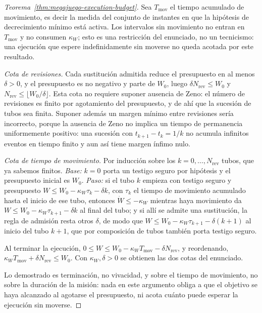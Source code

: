 \begin{proof}[Teorema~\ref{thm:megajuego-execution-budget}]
Sea $T_{\mathrm{mov}}$ el tiempo acumulado de movimiento, es decir la medida
del conjunto de instantes en que la hipótesis de decrecimiento mínimo está
activa. Los intervalos sin movimiento no entran en $T_{\mathrm{mov}}$ y no
consumen $\kappa_W$; esto es una restricción del enunciado, no un tecnicismo:
una ejecución que espere indefinidamente sin moverse no queda acotada por este
resultado.

\emph{Cota de revisiones.} Cada sustitución admitida reduce el presupuesto en
al menos $\delta>0$, y el presupuesto es no negativo y parte de $W_0$, luego
$\delta N_{\mathrm{rev}}\leq W_0$ y $N_{\mathrm{rev}}\leq\lfloor W_0/\delta\rfloor$.
Esta cota no requiere suponer ausencia de Zeno: el número de
revisiones es finito por agotamiento del presupuesto, y de ahí que la sucesión
de tubos sea finita. Suponer además un margen mínimo entre revisiones sería
incorrecto, porque la ausencia de Zeno no implica un tiempo de permanencia
uniformemente positivo: una sucesión con $t_{k+1}-t_k=1/k$ no acumula
infinitos eventos en tiempo finito y aun así tiene margen ínfimo nulo.

\emph{Cota de tiempo de movimiento.} Por inducción sobre los
$k=0,\ldots,N_{\mathrm{rev}}$ tubos, que ya sabemos finitos. \emph{Base:}
$k=0$ porta un testigo seguro por hipótesis y el presupuesto inicial es $W_0$.
\emph{Paso:} si el tubo $k$ empieza con testigo seguro y presupuesto
$W\leq W_0-\kappa_W\tau_k-\delta k$, con $\tau_k$ el tiempo de movimiento
acumulado hasta el inicio de ese tubo, entonces $\dot W\leq-\kappa_W$ mientras
haya movimiento da $W\leq W_0-\kappa_W\tau_{k+1}-\delta k$ al final del tubo; y
si allí se admite una sustitución, la regla de admisión resta otros $\delta$,
de modo que $W\leq W_0-\kappa_W\tau_{k+1}-\delta(k+1)$ al inicio del tubo
$k+1$, que por composición de tubos también porta testigo seguro.

Al terminar la ejecución, $0\leq W\leq W_0-\kappa_WT_{\mathrm{mov}}-\delta N_{\mathrm{rev}}$,
y reordenando, $\kappa_WT_{\mathrm{mov}}+\delta N_{\mathrm{rev}}\leq W_0$. Con
$\kappa_W,\delta>0$ se obtienen las dos cotas del enunciado.

Lo demostrado es terminación, no vivacidad, y sobre el tiempo de movimiento,
no sobre la duración de la misión: nada en este argumento obliga a que el
objetivo se haya alcanzado al agotarse el presupuesto, ni acota cuánto puede
esperar la ejecución sin moverse.
\end{proof}

